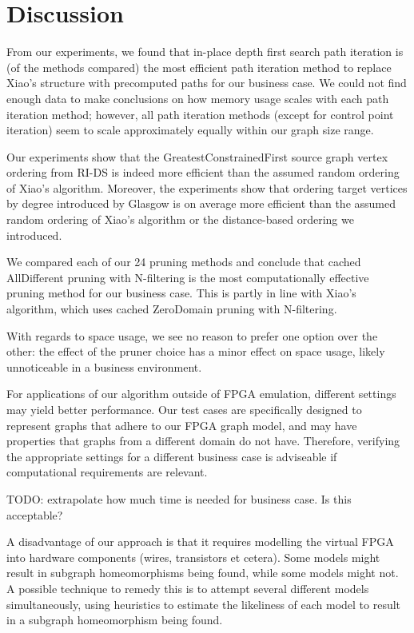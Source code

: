 \chapter{Discussion}
From our experiments, we found that in-place depth first search path iteration is (of the methods compared) the most efficient path iteration method to replace Xiao's structure with precomputed paths for our business case. We could not find enough data to make conclusions on how memory usage scales with each path iteration method; however, all path iteration methods (except for control point iteration) seem to scale approximately equally within our graph size range.

Our experiments show that the GreatestConstrainedFirst source graph vertex ordering from RI-DS \cite{RIalgorithm} is indeed more efficient than the assumed random ordering of Xiao's algorithm. Moreover, the experiments show that ordering target vertices by degree introduced by Glasgow \cite{McCreesh2015} is on average more efficient than the assumed random ordering of Xiao's algorithm or the distance-based ordering we introduced.

We compared each of our 24 pruning methods and conclude that cached AllDifferent pruning with N-filtering is the most computationally effective pruning method for our business case. This is partly in line with Xiao's algorithm, which uses cached ZeroDomain pruning with N-filtering.

With regards to space usage, we see no reason to prefer one option over the other: the effect of the pruner choice has a minor effect on space usage, likely unnoticeable in a business environment.

For applications of our algorithm outside of FPGA emulation, different settings may yield better performance. Our test cases are specifically designed to represent graphs that adhere to our FPGA graph model, and may have properties that graphs from a different domain do not have. Therefore, verifying the appropriate settings for a different business case is adviseable if computational requirements are relevant.

{\color{red} TODO: extrapolate how much time is needed for business case. Is this acceptable?}

A disadvantage of our approach is that it requires modelling the virtual FPGA into hardware components (wires, transistors et cetera). Some models might result in subgraph homeomorphisms being found, while some models might not. A possible technique to remedy this is to attempt several different models simultaneously, using heuristics to estimate the likeliness of each model to result in a subgraph homeomorphism being found.

